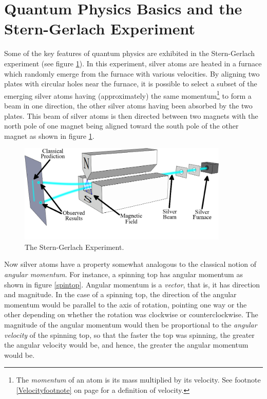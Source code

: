 \documentclass[12pt]{report}
\begin{document}
\section{Quantum Physics Basics and the Stern-Gerlach Experiment}
Some of the key features of quantum physics are exhibited in the Stern-Gerlach experiment (see figure \ref{stern}).
In this experiment, silver atoms are heated in a furnace which randomly emerge from the furnace with various velocities. By aligning two plates with circular holes near the furnace, it is possible to select a subset of the emerging silver atoms having (approximately) the same momentum\footnote{The \emph{momentum} of an atom is its mass multiplied by its velocity. See footnote \ref{Velocityfootnote} on page \pageref{Velocityfootnote} for a definition of velocity.} to form a beam in one direction, the other silver atoms having been absorbed by the two plates. This beam of silver atoms is then directed between two magnets with the north pole of one magnet being aligned toward the south pole of the other magnet as shown in figure \ref{stern}.
\begin{figure}[ht!]
\captionsetup{justification=justified}
\centering
\includegraphics[width=100mm]{Chapter01/Stern-Gerlach_experiment_svg.png}
\caption[Stern-Gerlach Experiment]{The Stern-Gerlach Experiment.\protect\footnotemark}
\label{stern}
\end{figure}
Now silver atoms have a property somewhat analogous to the classical notion of \emph{angular momentum}. For instance, a spinning top has angular momentum as shown in figure \ref{spintop}. Angular momentum is a \emph{vector}, that is, it has direction and magnitude. In the case of a spinning top, the direction of the angular momentum would be parallel to the axis of rotation, pointing one way or the other depending on whether the rotation was clockwise or counterclockwise. The magnitude of the angular momentum would then be proportional to the \emph{angular velocity} of the spinning top, so that the faster the top was spinning, the greater the angular velocity would be, and hence, the greater the angular momentum would be.
\end{document}
